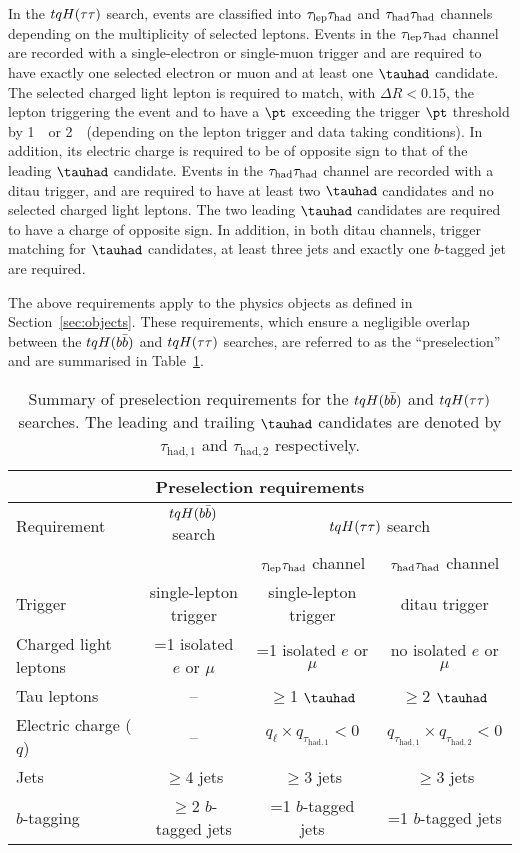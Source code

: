In the $tqH(\tau\tau)$ search, events are classified into $\tau_{\mathrm{lep}} \tau_{\mathrm{had}}$ and $\tau_{\mathrm{had}} \tau_{\mathrm{had}}$ channels depending on the 
multiplicity of selected leptons. Events in the $\tau_{\mathrm{lep}} \tau_{\mathrm{had}}$ channel are recorded with a single-electron or single-muon trigger 
and are required to have exactly one selected electron or muon and at least one $\tauhad$ candidate. 
The selected charged light lepton is required to match, with $\Delta R < 0.15$, the lepton triggering the event and to have a $\pt$ exceeding the trigger $\pt$ threshold by 1~\gev\ or 2~\gev\ (depending on the lepton trigger and 
data taking conditions). In addition, its electric charge is required to be of opposite sign to that of the leading $\tauhad$ candidate.
Events in the $\tau_{\mathrm{had}} \tau_{\mathrm{had}}$ channel are recorded with a ditau trigger, and are required to have at least two $\tauhad$ candidates and 
no selected charged light leptons. The two leading $\tauhad$ candidates are required to have a charge of opposite sign. 
In addition, in both ditau channels, trigger matching for $\tauhad$ candidates, at least three jets and exactly one $b$-tagged jet are required.

The above requirements apply to the physics objects as defined in Section~\ref{sec:objects}.
These requirements, which ensure a negligible overlap between the $tqH(b\bar{b})$ and $tqH(\tau\tau)$ searches,
are referred to as the ``preselection'' and are summarised in Table~\ref{tab:preselection}. 

\begin{table*}[t!]
\begin{center}
\begin{tabular}{l|c|cc}
\toprule\toprule
\multicolumn{4}{c}{Preselection requirements} \\      
\midrule
Requirement &  $tqH(b\bar{b})$ search & \multicolumn{2}{c}{$tqH(\tau\tau)$ search} \\      
& & $\tau_{\mathrm{lep}} \tau_{\mathrm{had}}$ channel & $\tau_{\mathrm{had}} \tau_{\mathrm{had}}$ channel \\
\midrule
Trigger & single-lepton trigger & single-lepton trigger & ditau trigger  \\
Charged light leptons  & =1 isolated $e$ or $\mu$ & =1 isolated $e$ or $\mu$ & no isolated $e$ or $\mu$ \\
Tau leptons & -- & $\geq$1 $\tauhad$ & $\geq$2 $\tauhad$ \\
Electric charge ($q$) & -- & $q_\ell \times q_{\tau_{\mathrm{had,1}}} < 0$ & $q_{\tau_{\mathrm{had,1}}} \times q_{\tau_{\mathrm{had,2}}} < 0$ \\
Jets  &  $\geq$4 jets & $\geq$3 jets & $\geq$3 jets \\
$b$-tagging & $\geq$2 $b$-tagged jets & =1 $b$-tagged jets & =1 $b$-tagged jets  \\
\bottomrule\bottomrule
\end{tabular}
\caption{\small{Summary of preselection requirements for the $tqH(b\bar{b})$ and $tqH(\tau\tau)$ searches. 
The leading and trailing $\tauhad$ candidates are denoted by $\tau_{\mathrm{had,1}}$ and $\tau_{\mathrm{had,2}}$ respectively.}}
\label{tab:preselection}
\end{center}
\end{table*}
